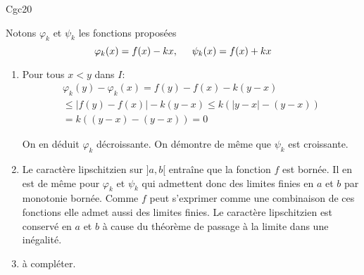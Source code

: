 \begin{tiny}Cgc20\end{tiny} Notons $\varphi_k$ et $\psi_k$ les fonctions proposées
\begin{displaymath}
  \varphi_k(x) = f(x) -kx, \hspace{0.5cm} \psi_k(x) = f(x) +kx
\end{displaymath}
\begin{enumerate}
  \item Pour tous $x<y$ dans $I$:
\begin{multline*}
\varphi_k(y) - \varphi_k(x) = f(y)-f(x) - k(y-x)\\
\leq \left|f(y)-f(x)\right| - k(y-x)
\leq k\left( \left|y-x\right| -(y-x)\right)\\
= k\left( (y-x) -(y-x)\right) = 0
\end{multline*}

On en déduit $\varphi_k$ décroissante.\newline
On démontre de même que $\psi_k$ est croissante.

  \item Le caractère lipschitzien sur $]a,b[$ entraîne que la fonction $f$ est bornée. Il en est de même pour $\varphi_k$ et $\psi_k$ qui admettent donc des limites finies en $a$ et $b$ par monotonie bornée. Comme $f$ peut s'exprimer comme une combinaison de ces fonctions elle admet aussi des limites finies. Le caractère lipschitzien est conservé en $a$ et $b$ à cause du théorème de passage à la limite dans une inégalité.
  
  \item à compléter.
\end{enumerate}

